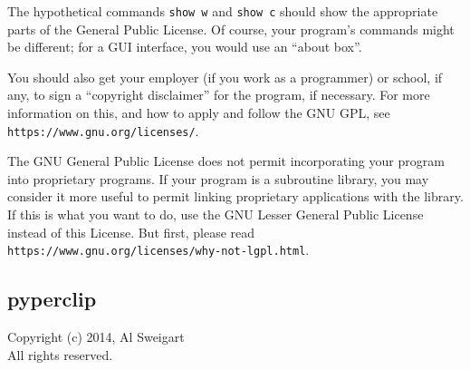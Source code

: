 \documentclass{article}
\begin{document}
\begin{enumerate}
    The hypothetical commands {\tt show w} and {\tt show c} should show
    the appropriate
    parts of the General Public License.  Of course, your program's commands
    might be different; for a GUI interface, you would use an ``about box''.
    
    You should also get your employer (if you work as a programmer) or
    school, if any, to sign a ``copyright disclaimer'' for the program, if
    necessary.  For more information on this, and how to apply and follow
    the GNU GPL, see \texttt{https://www.gnu.org/licenses/}.
    
    The GNU General Public License does not permit incorporating your
    program into proprietary programs.  If your program is a subroutine
    library, you may consider it more useful to permit linking proprietary
    applications with the library.  If this is what you want to do, use
    the GNU Lesser General Public License instead of this License.  But
    first, please read \texttt{https://www.gnu.org/licenses/why-not-lgpl.html}.
    
    \end{enumerate}
    \subsection{pyperclip}
    Copyright (c) 2014, Al Sweigart\\
    All rights reserved.\\
\end{document}

